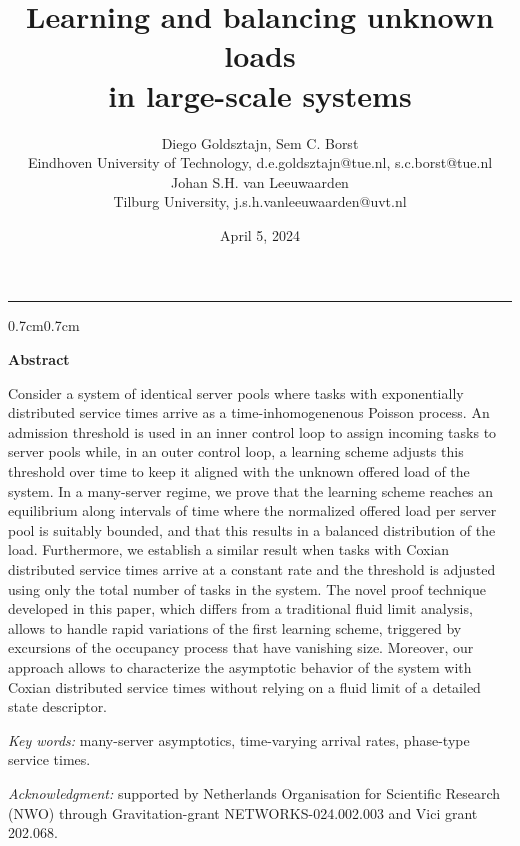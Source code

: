 \documentclass[a4paper, 12pt]{article}
\title{Learning and balancing unknown loads \\ in large-scale systems \vspace{\baselineskip}}
\author{
\normalsize{Diego Goldsztajn, Sem C. Borst}\\ \footnotesize{Eindhoven University of Technology, d.e.goldsztajn@tue.nl, s.c.borst@tue.nl} \\
\normalsize{Johan S.H. van Leeuwaarden}\\ \footnotesize{Tilburg University, j.s.h.vanleeuwaarden@uvt.nl} \\
}
\date{\vspace{\baselineskip} \normalsize{April 5, 2024}}
\theoremstyle{definition}
\begin{document}
\maketitle

\noindent\rule{\textwidth}{1pt}

\vspace{2\baselineskip}

\onehalfspacing

\begin{adjustwidth}{0.7cm}{0.7cm}
	\begin{center}
		\textbf{Abstract}
	\end{center}
	
	\vspace{0.3\baselineskip}
	
	\noindent Consider a system of identical server pools where tasks with exponentially distributed service times arrive as a time-inhomogenenous Poisson process. An admission threshold is used in an inner control loop to assign incoming tasks to server pools while, in an outer control loop, a learning scheme adjusts this threshold over time to keep it aligned with the unknown offered load of the system. In a many-server regime, we prove that the learning scheme reaches an equilibrium along intervals of time where the normalized offered load per server pool is suitably bounded, and that this results in a balanced distribution of the load. Furthermore, we establish a similar result when tasks with Coxian distributed service times arrive at a constant rate and the threshold is adjusted using only the total number of tasks in the system. The novel proof technique developed in this paper, which differs from a traditional fluid limit analysis, allows to handle rapid variations of the first learning scheme, triggered by excursions of the occupancy process that have vanishing size. Moreover, our approach allows to characterize the asymptotic behavior of the system with Coxian distributed service times without relying on a fluid limit of a detailed state descriptor.
	
	\vspace{\baselineskip}
	
	\small{\noindent \textit{Key words:} many-server asymptotics, time-varying arrival rates, phase-type service times.}
	
	\vspace{0.3\baselineskip}
	
	\small{\noindent \textit{Acknowledgment:} supported by Netherlands Organisation for Scientific Research (NWO) through Gravitation-grant NETWORKS-024.002.003 and Vici grant 202.068.} 
\end{adjustwidth}
\end{document}
